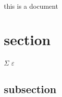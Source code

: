
\ll



this is a document

\section{section}

  $\Sigma$
  $\varepsilon$
  
\subsection{subsection}



\lk


